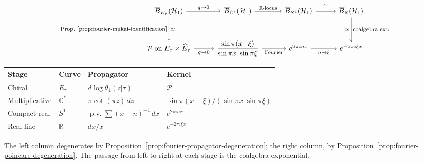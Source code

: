 \begin{theorem}
\label{thm:fourier-recovery}
\begin{equation}\label{eq:fourier-degeneration-chain}
\begin{tikzcd}[column sep=2.8em, row sep=2.8em]
\barB_{E_\tau}(\mathcal{H}_1)
  \arrow[r, "q \to 0"]
  \arrow[d, "\text{\footnotesize Prop.\
    \ref{prop:fourier-mukai-identification}}"', "\simeq"]
& \barB_{\mathbb{C}^*}(\mathcal{H}_1)
  \arrow[r, "\mathbb{R}\text{-locus}"]
& \barB_{S^1}(\mathcal{H}_1)
  \arrow[r, "\widetilde{\phantom{xx}}"]
& \barB_{\mathbb{R}}(\mathcal{H}_1)
  \arrow[d, "\text{\footnotesize coalgebra exp}",
    "\simeq"']
\\
\mathcal{P}\;\text{on}\;
  E_\tau \times \widehat{E}_\tau
  \arrow[r, "q \to 0"']
& \dfrac{\sin\pi(x{-}\xi)}
        {\sin\pi x\;\sin\pi\xi}
  \arrow[r, "\text{Fourier}"']
& e^{2\pi inx}
  \arrow[r, "n \to \xi"']
& e^{-2\pi i\xi x}
\end{tikzcd}
\end{equation}
\begin{center}
\small
\renewcommand{\arraystretch}{1.4}
\begin{tabular}{llll}
\textbf{Stage}
  & \textbf{Curve}
  & \textbf{Propagator}
  & \textbf{Kernel} \\
\hline
Chiral
  & $E_\tau$
  & $d\log\theta_1(z|\tau)$
  & $\mathcal{P}$ \\
Multiplicative
  & $\mathbb{C}^*$
  & $\pi\cot(\pi z)\,dz$
  & $\sin\pi(x{-}\xi)/(\sin\pi x\;\sin\pi\xi)$ \\
Compact real
  & $S^1$
  & $\operatorname{p.v.}\sum(x{-}n)^{-1}\,dx$
  & $e^{2\pi inx}$ \\
Real line
  & $\mathbb{R}$
  & $dx/x$
  & $e^{-2\pi i\xi x}$
\end{tabular}
\end{center}
The left column degenerates by
Proposition~\textup{\ref{prop:fourier-propagator-degeneration}};
the right column, by
Proposition~\textup{\ref{prop:fourier-poincare-degeneration}}.
The passage from left to right at each stage is the coalgebra
exponential.
\end{theorem}

